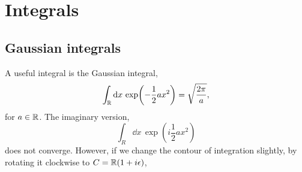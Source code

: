 \section{Integrals}
\subsection{Gaussian integrals}
A useful integral is the Gaussian integral,
\begin{equation}
    \int_{\mathbb{R}} \dd x \, \exp(- \frac{1}{2} a x^2) = \sqrt{\frac{2 \pi}{a}},
\end{equation}
for $a \in \mathbb{R}$. The imaginary version,
\begin{equation}
    \int_R \dd x \, \exp(i \frac{1}{2} a x^2 ) 
\end{equation}
does not converge. However, if we change the contour of integration slightly, by rotating it clockwise to $C = \mathbb{R}(1 + i\epsilon)$,
\begin{figure}
    \begin{subfigure}{0.4\textwidth}
    \end{subfigure}
    \begin{subfigure}{0.18\textwidth}
    \end{subfigure}
    \begin{subfigure}{0.4\textwidth}
    \end{subfigure}
\end{figure}
